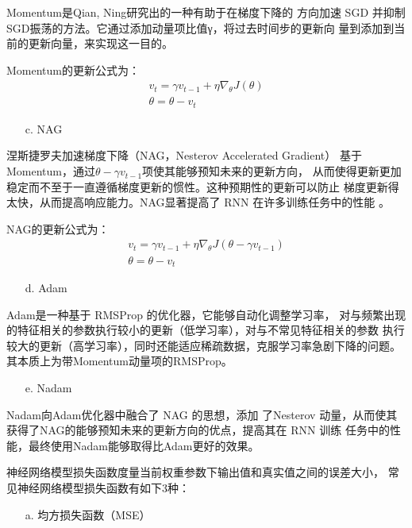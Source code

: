 \documentclass[AutoFakeBold]{LZUThesis}
\begin{document}
Momentum是Qian, Ning研究出的一种有助于在梯度下降的
方向加速 SGD 并抑制SGD振荡的方法。它通过添加动量项比值γ，将过去时间步的更新向
量到添加到当前的更新向量，来实现这一目的。

Momentum的更新公式为：
$$
\begin{matrix}
v_t = \gamma v_{t-1} + \eta \nabla_\theta J( \theta)\\
\theta = \theta - v_t
\end{matrix}
$$

\begin{itemize}
    \item[c. ] NAG
\end{itemize}

涅斯捷罗夫加速梯度下降（NAG，Nesterov Accelerated Gradient）
基于Momentum，通过$\theta - \gamma v_{t-1}$项使其能够预知未来的更新方向，
从而使得更新更加稳定而不至于一直遵循梯度更新的惯性。这种预期性的更新可以防止
梯度更新得太快，从而提高响应能力。NAG显著提高了 RNN 在许多训练任务中的性能
。

NAG的更新公式为：
$$
\begin{matrix}
v_t = \gamma v_{t-1} + \eta \nabla_\theta J( \theta - \gamma v_{t-1} )\\ 
\theta = \theta - v_t 
\end{matrix}
$$

\begin{itemize}
    \item[d. ] Adam
\end{itemize}

Adam是一种基于 RMSProp 的优化器，它能够自动化调整学习率，
对与频繁出现的特征相关的参数执行较小的更新（低学习率），对与不常见特征相关的参数
执行较大的更新（高学习率），同时还能适应稀疏数据，克服学习率急剧下降的问题。
其本质上为带Momentum动量项的RMSProp。

\begin{itemize}
    \item[e. ] Nadam
\end{itemize}

Nadam向Adam优化器中融合了 NAG 的思想，添加
了Nesterov 动量，从而使其获得了NAG的能够预知未来的更新方向的优点，提高其在 RNN 训练
任务中的性能，最终使用Nadam能够取得比Adam更好的效果。

神经网络模型损失函数度量当前权重参数下输出值和真实值之间的误差大小，
常见神经网络模型损失函数有如下3种：
\begin{itemize}
    \item[a. ] 均方损失函数（MSE）
\end{itemize}
\end{document}
